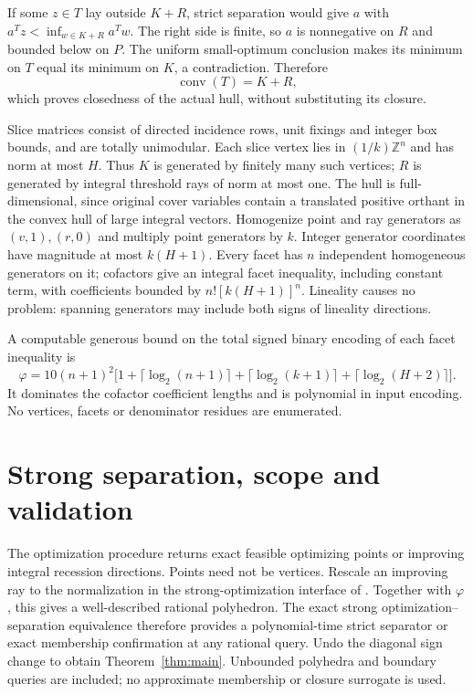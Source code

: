 \documentclass[11pt]{article}
\newcommand{\Z}{\mathbb Z}
\newcommand{\conv}{\operatorname{conv}}
\begin{document}
If some $z\in T$ lay outside $K+R$, strict separation would give $a$ with
$a^Tz<\inf_{w\in K+R}a^Tw$. The right side is finite, so $a$ is nonnegative
on $R$ and bounded below on $P$. The uniform small-optimum conclusion makes
its minimum on $T$ equal its minimum on $K$, a contradiction. Therefore
\[
 \conv(T)=K+R,
\]
which proves closedness of the actual hull, without substituting its closure.

Slice matrices consist of directed incidence rows, unit fixings and integer
box bounds, and are totally unimodular. Each slice vertex lies in
$(1/k)\Z^n$ and has norm at most $H$. Thus $K$ is generated by finitely many
such vertices; $R$ is generated by integral threshold rays of norm at most
one. The hull is full-dimensional, since original cover variables contain a
translated positive orthant in the convex hull of large integral vectors.
Homogenize point and ray generators as $(v,1),(r,0)$ and multiply point
generators by $k$. Integer generator coordinates have magnitude at most
$k(H+1)$. Every facet has $n$ independent homogeneous generators on it;
cofactors give an integral facet inequality, including constant term, with
coefficients bounded by $n![k(H+1)]^n$. Lineality causes no problem: spanning
generators may include both signs of lineality directions.

A computable generous bound on the total signed binary encoding of each
facet inequality is
\[
 \varphi=10(n+1)^2\bigl[1+\lceil\log_2(n+1)\rceil+
 \lceil\log_2(k+1)\rceil+\lceil\log_2(H+2)\rceil\bigr].
\]
It dominates the cofactor coefficient lengths and is polynomial in input
encoding. No vertices, facets or denominator residues are enumerated.

\section{Strong separation, scope and validation}
The optimization procedure returns exact feasible optimizing points or
improving integral recession directions. Points need not be vertices.
Rescale an improving ray to the normalization in the strong-optimization
interface of \cite[Definitions~6.2.1--6.2.2]{GLS}. Together with $\varphi$,
this gives a well-described rational polyhedron. The exact strong
optimization--separation equivalence \cite[Theorem~6.4.9, pp.~179--180]{GLS}
therefore provides a polynomial-time strict separator or exact membership
confirmation at any rational query. Undo the diagonal sign change to obtain
Theorem~\ref{thm:main}. Unbounded polyhedra and boundary queries are included;
no approximate membership or closure surrogate is used.
\end{document}
